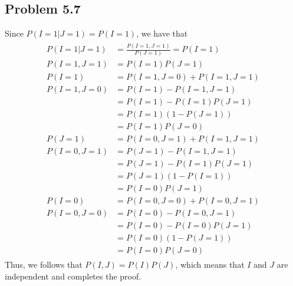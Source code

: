 \documentclass[12pt]{article}
\begin{document}



\subsection*{\bf Problem 5.7}

	Since $P(I=1 | J=1) = P(I=1)$, we have that
	$$\begin{aligned}
		\begin{aligned}
			P\left( I=1|J=1\right)
				&=\frac{P\left( I=1,J=1\right)  }{P\left( J=1\right)  } =P\left( I=1\right)  \\
			P\left( I=1,J=1\right)  
				&=\boxed{P\left( I=1\right)  P\left( J=1\right) }\\
			P\left( I=1\right)
				&=P\left( I=1,J=0\right)  +P\left( I=1,J=1\right)  \\ 
			P\left( I=1,J=0\right)  
				&=P\left( I=1\right)  -P\left( I=1,J=1\right)  \\ 
				&=P\left( I=1\right)  -P\left( I=1\right)  P\left( J=1\right)  \\ 
				&=P\left( I=1\right)  \left( 1-P\left( J=1\right)  \right)  \\ 
				&=\boxed{P\left( I=1\right)  P\left( J=0\right) } \\ 
			P\left( J=1\right)  
				&=P\left( I=0,J=1\right)  +P\left( I=1,J=1\right)  \\ P\left( I=0,J=1\right)  
				&=P\left( J=1\right)  -P\left( I=1,J=1\right)  \\ 
				&=P\left( J=1\right)  -P\left( I=1\right)  P\left( J=1\right)  \\ 
				&=P\left( J=1\right)  \left( 1-P\left( I=1\right)  \right)  \\ 
				&=\boxed{P\left( I=0\right)  P\left( J=1\right) } \\ 
			P\left( I=0\right)  
				&=P\left( I=0,J=0\right)  +P\left( I=0,J=1\right)  \\ 
			P\left( I=0,J=0\right)  
				&=P\left( I=0\right)  -P\left( I=0,J=1\right)  \\ 
				&=P\left( I=0\right)  -P\left( I=0\right)  P\left( J=1\right)  \\ 
				&=P\left( I=0\right)  \left( 1-P\left( J=1\right)  \right)  \\ 
				&=\boxed{P\left( I=0\right)  P\left( J=0\right)  }
		\end{aligned}  
	\end{aligned} $$
	Thus, we follows that $P\left( I,J\right) = P\left( I\right)  P\left( J\right)$, which means that $I$ and $J$ are independent and completes the proof.
	\\
\end{document}
